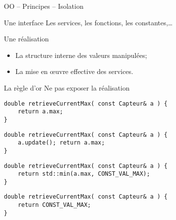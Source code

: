 \documentclass[handout,10pt]{beamer}
\begin{document}
\begin{frame}[fragile]{OO -- Principes -- Isolation}
\begin{block}{Une interface}
Les services, les fonctions, les constantes,\ldots
\end{block}

\begin{block}{Une réalisation}
\begin{itemize}
\item La structure interne des valeurs manipulées;
\item La mise en œuvre effective des services.
\end{itemize}
\end{block}

\begin{block}{La règle d'or}
\alert{Ne pas exposer la réalisation}

\begin{minipage}{0.49\textwidth}
\begin{lstlisting}
double retrieveCurrentMax( const Capteur& a ) {
    return a.max;
}
\end{lstlisting}

\begin{lstlisting}
double retrieveCurrentMax( const Capteur& a ) {
    a.update(); return a.max;
}
\end{lstlisting}
\end{minipage}
\begin{minipage}{0.49\textwidth}
\begin{lstlisting}
double retrieveCurrentMax( const Capteur& a ) {
    return std::min(a.max, CONST_VAL_MAX);
}
\end{lstlisting}
\begin{lstlisting}
double retrieveCurrentMax( const Capteur& a ) {
    return CONST_VAL_MAX;
}
\end{lstlisting}
\end{minipage}
\end{block}
\end{frame}
\end{document}
